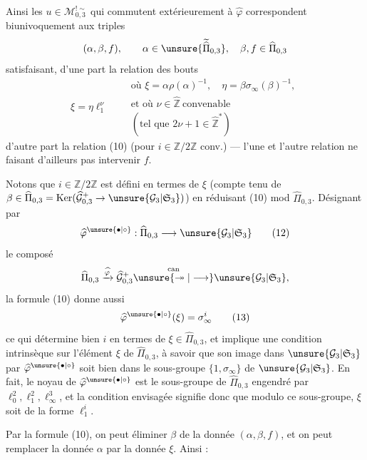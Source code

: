 Ainsi les $u\in\mathcal M_{0,3}^{!\sim}$ qui commutent
extérieurement à $\widehat\varphi$ correspondent biunivoquement aux
 triples 
\[
(\alpha,\beta,f),\qquad
\alpha\in\unsure{\widetilde{\widehat\Pi}_{0,3}},\quad
\beta,f\in\widehat\Pi_{0,3}
\]
satisfaisant, d'une part la relation des bouts
\[
\xi=\eta\ell_1^\nu
\qquad
\begin{gathered}
\text{où }\xi=\alpha\rho(\alpha)^{-1},\quad
\eta=\beta\sigma_\infty(\beta)^{-1},\\
\text{et où }\nu\in\widehat{\mathbb Z}\ \text{convenable}\\
(\text{tel que }2\nu+1\in\widehat{\mathbb Z}^{*})
\end{gathered}
\tag{11}
\]
d'autre part la relation (10) (pour $i\in\mathbb Z/2\mathbb Z$ conv.)
--- l'une et l'autre relation ne faisant d'ailleurs pas intervenir $f$.


Notons que $i\in\mathbb Z/2\mathbb Z$ est défini en termes de
$\xi$ (compte tenu de
$\beta\in\widehat\Pi_{0,3}=\operatorname{Ker}
(\widehat{\mathcal G}_{0,3}^{+}\to\unsure{\mathcal G_3|\mathfrak S_3})$)
en réduisant (10) mod $\widehat\Pi_{0,3}$. Désignant par
\[
\widehat\varphi^{\unsure{\bullet|\circ}}:
\widehat\Pi_{0,3}\longrightarrow\unsure{\mathcal G_3|\mathfrak S_3}
\tag{12}
\]
le composé
\[
\widehat\Pi_{0,3}\xrightarrow{\widehat\varphi}
\widehat{\mathcal G}_{0,3}^{+}
\overset{\mathrm{can}}{\unsure{\twoheadrightarrow|\longrightarrow}}
\unsure{\mathcal G_3|\mathfrak S_3},
\]
la formule (10) donne aussi
\[
\widehat\varphi^{\unsure{\bullet|\circ}}(\xi)=\sigma_\infty^i
\tag{13}
\]
ce qui détermine bien $i$ en termes de
$\xi\in\widehat\Pi_{0,3}$, et implique une condition intrinsèque sur
l'élément $\xi$ de $\widehat\Pi_{0,3}$, à savoir que son image dans
$\unsure{\mathcal G_3|\mathfrak S_3}$ par
$\widehat\varphi^{\unsure{\bullet|\circ}}$ soit bien dans le sous-groupe
$\{1,\sigma_\infty\}$ de $\unsure{\mathcal G_3|\mathfrak S_3}$.
En fait, le noyau de $\widehat\varphi^{\unsure{\bullet|\circ}}$ est
le sous-groupe  de $\widehat\Pi_{0,3}$ engendré par
$\ell_0^2,\ell_1^2,\ell_\infty^3$, et la condition envisagée signifie
donc que modulo ce sous-groupe, $\xi$ soit de la forme $\ell_1^i$.

Par la formule (10), on peut éliminer $\beta$ de la donnée
$(\alpha,\beta,f)$, et on peut remplacer la donnée $\alpha$ par la donnée
$\xi$. Ainsi :

